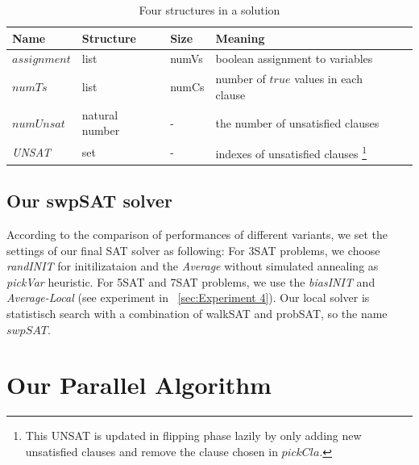 \documentclass[12pt,a4paper,twoside]{scrartcl}
\numberwithin{equation}{section}
\begin{document}
\begin{table}[h!]
\begin{center}
    \begin{tabular}{|l|l|l|l|p{1cm}|}
\hline 
 	Name &Structure & Size & Meaning\\ \hline
    $assignment$&list & numVs & boolean assignment to variables\\ \hline
	$numTs$&list & numCs& number of $true$ values in each clause \\ \hline
	$numUnsat$& natural number & -&the number of unsatisfied clauses  \\ \hline
	\emph{UNSAT}& set & - & indexes of unsatisfied clauses \footnote{This UNSAT is updated in flipping phase lazily by only adding new unsatisfied clauses and remove the clause chosen in $pickCla$.}\\ \hline

	
\end{tabular}
\caption[probSAT]{Four structures in a solution}
\end{center}
\end{table} 
\subsection{Our swpSAT solver}
\label{subsec:swpSAT}
According to the comparison of performances of different variants,  we set the settings of our final SAT solver as following: For 3SAT problems, we choose \emph{randINIT} for initilizataion and the \emph{Average}  without simulated annealing as \emph{pickVar} heuristic. For 5SAT and 7SAT problems, we use the \emph{biasINIT} and \emph{Average-Local} (see experiment in ~\ref{sec:Experiment 4}).  Our local solver is statistisch search with a combination of walkSAT and probSAT, so the name $swpSAT$.
\section{Our Parallel Algorithm}
\label{sec:parallel}
\label{sec:Our parallel Algorithm}
\end{document}
